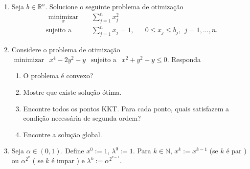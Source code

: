 \documentclass[a4paper,latin]{article}
\begin{document}
\begin{enumerate}
    {\it Dica: } Re-escreva o problema 
    $
    \underset{x \in \Delta(n)}{\text{minimizar}} \ \ 
    \text{max}\{ \langle a_{i}, x\rangle : i=1, \dots, m \} 
    $
    como 
    $
    \underset{x \in \Delta(n), v }{\text{minimizar}} \ \ 
    v \ \ \text{ s.a. } \langle a_{i}, x\rangle \leq v, \ \ 
    \forall i
    $, e aplique dualidade neste último problema. 
    \item Seja $b \in \mathbb{R}^{n}$. Solucione o seguinte 
    problema de otimização 
      \begin{equation*}
       \begin{aligned}
        & \underset{x}{\text{ minimizar }}
        & & \sum_{j=1}^{n} x^2_j \\
        & \text{sujeito a }
        & & \sum_{j=1}^n x_j=1, 
        & & 0 \leq x_{j} \leq b_{j}, \ \ j=1,\dots, n.
       \end{aligned}
      \end{equation*}
    \item Considere o problema de otimização  
     $ 
     \text{ minimizar } \ \  x^4-2y^2-y \ \ 
     \text{ sujeito a } \ \ x^2+y^2+y \leq 0 
     $.
     Responda
         \begin{enumerate}
         	\item O problema é convexo?
         	\item Mostre que existe solução ótima.
         	\item Encontre todos os pontos KKT. Para cada ponto,  quais satisfazem a condição necessária de segunda ordem?
         	\item Encontre a solução global.  
         \end{enumerate} 

    \item Seja $\alpha \in (0,1)$.     Define $x^{0}:=1$, $\lambda^{0}:=1$.
    Para $k \in \mathbb{N}$, 
    $x^{k}:= x^{k-1}$ (se $k$ é par ) 
    ou $\alpha^{2^{k}}$ 
    ( se $k$ é impar ) e 
    $\lambda^{k}:= \alpha^{2^{k-1}}$.
    

\end{enumerate}
\end{document}
